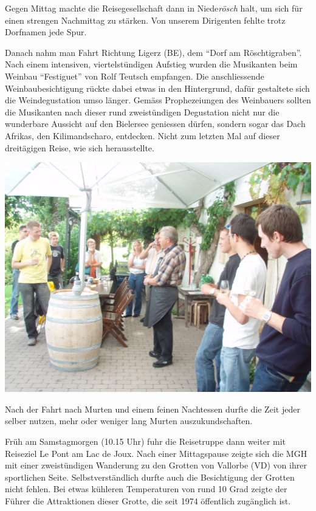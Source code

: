 \begin{history}
    Gegen Mittag machte die Reisegesellschaft dann in Niede\emph{rösch} halt, um
    sich für einen strengen Nachmittag zu stärken. Von unserem Dirigenten fehlte
    trotz Dorfnamen jede Spur.

    Danach nahm man Fahrt Richtung Ligerz (BE), dem \enquote{Dorf am
        Röschtigraben}. Nach einem intensiven, viertelstündigen Aufstieg wurden
    die Musikanten beim Weinbau \enquote{Festiguet} von Rolf Teutsch
    empfangen. Die anschliessende Weinbaubesichtigung rückte dabei etwas in
    den Hintergrund, dafür gestaltete sich die Weindegustation umso länger.
    Gemäss Prophezeiungen des Weinbauers sollten die Musikanten nach dieser
    rund zweistündigen Degustation nicht nur die wunderbare Aussicht auf den
    Bielersee geniessen dürfen, sondern sogar das Dach Afrikas, den
    Kilimandscharo, entdecken. Nicht zum letzten Mal auf dieser dreitägigen
    Reise, wie sich herausstellte.

    \begin{MulticolFigure}
        \centering
        \includegraphics[width=0.93\linewidth]{./chap/2001-2024/2007/Weindegu.jpg}
    \end{MulticolFigure}


    Nach der Fahrt nach Murten und einem feinen Nachtessen durfte die Zeit jeder
    selber nutzen, mehr oder weniger lang Murten auszukundschaften.

    Früh am Samstagmorgen (10.15 Uhr) fuhr die Reisetruppe dann weiter mit
    Reiseziel Le Pont am Lac de Joux. Nach einer Mittagspause zeigte sich die
    MGH mit einer zweistündigen Wanderung zu den Grotten von Vallorbe (VD) von
    ihrer sportlichen Seite. Selbstverständlich durfte auch die Besichtigung der
    Grotten nicht fehlen. Bei etwas kühleren Temperaturen von rund 10 Grad
    zeigte der Führer die Attraktionen dieser Grotte, die seit 1974 öffentlich
    zugänglich ist.


\end{history}
